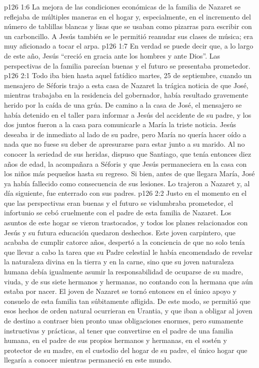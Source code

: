 \vs p126 1:6 La mejora de las condiciones económicas de la familia de Nazaret se reflejaba de múltiples maneras en el hogar y, especialmente, en el incremento del número de tablillas blancas y lisas que se usaban como pizarras para escribir con un carboncillo. A Jesús también se le permitió reanudar sus clases de música; era muy aficionado a tocar el arpa.
\vs p126 1:7 \pc En verdad se puede decir que, a lo largo de este año, Jesús “creció en gracia ante los hombres y ante Dios”. Las perspectivas de la familia parecían buenas y el futuro se presentaba prometedor.
\vs p126 2:1 Todo iba bien hasta aquel fatídico martes, 25 de septiembre, cuando un mensajero de Séforis trajo a esta casa de Nazaret la trágica noticia de que José, mientras trabajaba en la residencia del gobernador, había resultado gravemente herido por la caída de una grúa. De camino a la casa de José, el mensajero se había detenido en el taller para informar a Jesús del accidente de su padre, y los dos juntos fueron a la casa para comunicarle a María la triste noticia. Jesús deseaba ir de inmediato al lado de su padre, pero María no quería hacer oído a nada que no fuese su deber de apresurarse para estar junto a su marido. Al no conocer la seriedad de sus heridas, dispuso que Santiago, que tenía entonces diez años de edad, la acompañara a Séforis y que Jesús permaneciera en la casa con los niños más pequeños hasta su regreso. Si bien, antes de que llegara María, José ya había fallecido como consecuencia de sus lesiones. Lo trajeron a Nazaret y, al día siguiente, fue enterrado con sus padres.
\vs p126 2:2 \pc Justo en el momento en el que las perspectivas eran buenas y el futuro se vislumbraba prometedor, el infortunio se cebó cruelmente con el padre de esta familia de Nazaret. Los asuntos de este hogar se vieron trastocados, y todos los planes relacionados con Jesús y su futura educación quedaron deshechos. Este joven carpintero, que acababa de cumplir catorce años, despertó a la conciencia de que no solo tenía que llevar a cabo la tarea que su Padre celestial le había encomendado de revelar la naturaleza divina en la tierra y en la carne, sino que su joven naturaleza humana debía igualmente asumir la responsabilidad de ocuparse de su madre, viuda, y de sus siete hermanos y hermanas, no contando con la hermana que aún estaba por nacer. El joven de Nazaret se tornó entonces en el único apoyo y consuelo de esta familia tan súbitamente afligida. De este modo, se permitió que esos hechos de orden natural ocurrieran en Urantia, y que iban a obligar al joven de destino a contraer bien pronto unas obligaciones enormes, pero sumamente instructivas y prácticas, al tener que convertirse en el padre de una familia humana, en el padre de sus propios hermanos y hermanas, en el sostén y protector de su madre, en el custodio del hogar de su padre, el único hogar que llegaría a conocer mientras permaneció en este mundo.
